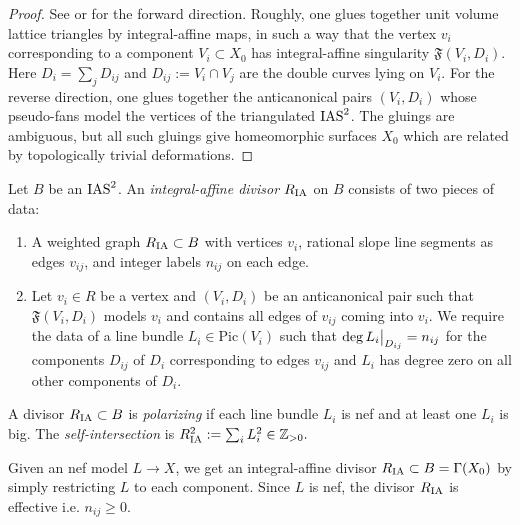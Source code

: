 \documentclass[table,x11names]{amsart}
\begin{document}
\begin{proof}  See \cite{engel2018looijenga} or
\cite[Rem1.11v1]{gross2015mirror-symmetry-for-log} for the
  forward direction. Roughly, one glues together unit volume lattice triangles
  by integral-affine maps, in such a way
  that the vertex $v_i$ corresponding to a component $V_i\subset X_0$
  has integral-affine singularity
  $\mathfrak{F}(V_i,D_i)$. Here $D_i=\sum_j D_{ij}$ and $D_{ij}:=V_i\cap V_j$
  are the double curves lying on $V_i$.  
  For the reverse direction, one glues together the
  anticanonical pairs $(V_i,D_i)$ whose pseudo-fans 
  model the vertices of the triangulated $\operatorname{IAS}^2$. The gluings
  are ambiguous, but all such gluings give homeomorphic surfaces $X_0$
  which are related by topologically trivial deformations.
  \end{proof} 

\begin{definition}\label{IAdivisor}
  Let $B$ be an $\operatorname{IAS}^2$. An {\it integral-affine divisor} $R_{\rm IA}$ on
  $B$ consists of two pieces of data:
  \begin{enumerate}
  \item A weighted graph $R_{\rm IA}\subset B$ with vertices $v_i$,
    rational slope line segments as edges $v_{ij}$, and integer labels
    $n_{ij}$ on each edge. %

  \item Let $v_i\in R$ be a vertex and $(V_i ,D_i)$ be an
    anticanonical pair such that $\mathfrak{F}(V_i ,D_i)$ models $v_i$
    and contains all edges of $v_{ij}$ coming into $v_i$. We require
    the data of a line bundle $L_i \in \textrm{Pic}(V_i)$ such that
    $\deg{L_i}\big{|}_{D_{ij}}=n_{ij}$ for the components $D_{ij}$ of
    $D_i$ corresponding to edges $v_{ij}$ and $L_i$ has degree zero on
    all other components of $D_i$.
  \end{enumerate}
\end{definition} 

\begin{definition}\label{def:polarizing-ia-div}
  A divisor $R_{{\rm IA}}\subset B$ is {\it polarizing} if each line bundle
  $L_i$ is nef and at least one $L_i$ is big. The {\it
    self-intersection} is
  $R_{\rm IA}^2:=\sum_i L_i^2\in \mathbb{Z}_{>0}.$
\end{definition}

\begin{definition}
  Given an nef model $L\rightarrow X$,
  we get an integral-affine divisor
  $R_{\rm IA}\subset B=\Gamma(X_0)$ by simply restricting
  $L$ to each component. Since $L$ is nef,
  the divisor $R_{\rm IA}$ is effective i.e. $n_{ij}\geq 0$.
\end{definition}
\end{document}
